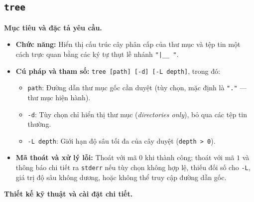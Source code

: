 \documentclass[12pt,a4paper]{article}
\begin{document}
\subsection{\texttt{tree}}

\textbf{Mục tiêu và đặc tả yêu cầu.}
\begin{itemize}
  \item \textbf{Chức năng:} Hiển thị cấu trúc cây phân cấp của thư mục và tệp tin một cách trực quan bằng các ký tự thụt lề nhánh \texttt{"|\_\_ "}.
  \item \textbf{Cú pháp và tham số:} \texttt{tree [path] [-d] [-L depth]}, trong đó:
  \begin{itemize}
    \item \texttt{path}: Đường dẫn thư mục gốc cần duyệt (tùy chọn, mặc định là \texttt{"."} --- thư mục hiện hành).
    \item \texttt{-d}: Tùy chọn chỉ hiển thị thư mục (\textit{directories only}), bỏ qua các tệp tin thường.
    \item \texttt{-L depth}: Giới hạn độ sâu tối đa của cây duyệt (\texttt{depth > 0}).
  \end{itemize}
  \item \textbf{Mã thoát và xử lý lỗi:} Thoát với mã $0$ khi thành công; thoát với mã $1$ và thông báo chi tiết ra \texttt{stderr} nếu tùy chọn không hợp lệ, thiếu đối số cho \texttt{-L}, giá trị độ sâu không dương, hoặc không thể truy cập đường dẫn gốc.
\end{itemize}

\textbf{Thiết kế kỹ thuật và cài đặt chi tiết.}
\end{document}
